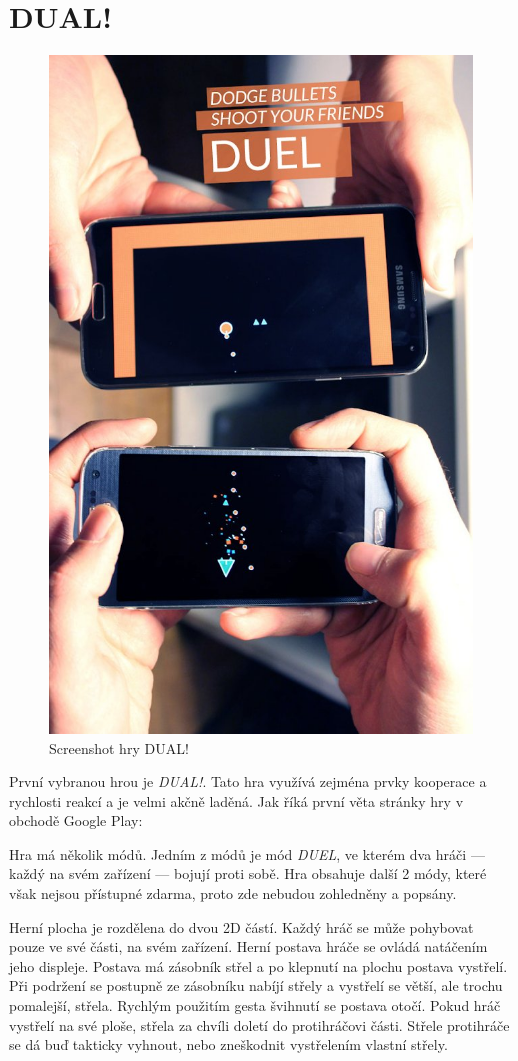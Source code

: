 \section{DUAL!}

\begin{figure}
    \centering
    \includegraphics[width=0.5\linewidth]{assets/competitive-apps/dual.jpg}
    \caption{Screenshot hry DUAL!~\cite{seabaa_dual}}
    \label{fig:dual}
\end{figure}

První vybranou hrou je \emph{DUAL!}.
Tato hra využívá zejména prvky kooperace a rychlosti reakcí
a je velmi akčně laděná.
Jak říká první věta stránky hry v obchodě Google Play:
~\cite{seabaa_dual}

Hra má několik módů.
Jedním z módů je mód \emph{DUEL}, ve kterém dva hráči
--- každý na svém zařízení ---
bojují proti sobě.
Hra obsahuje další 2 módy, které však nejsou přístupné zdarma,
proto zde nebudou zohledněny a popsány.

Herní plocha je rozdělena do dvou 2D částí.
Každý hráč se může pohybovat pouze ve své části, na svém zařízení.
Herní postava hráče se ovládá natáčením jeho displeje.
Postava má zásobník střel a po klepnutí na plochu postava vystřelí.
Při podržení se postupně ze zásobníku nabíjí střely
a vystřelí se větší, ale trochu pomalejší, střela.
Rychlým použitím gesta švihnutí se postava otočí.
Pokud hráč vystřelí na své ploše,
střela za chvíli doletí do protihráčovi části.
Střele protihráče se dá buď takticky vyhnout,
nebo zneškodnit vystřelením vlastní střely.

